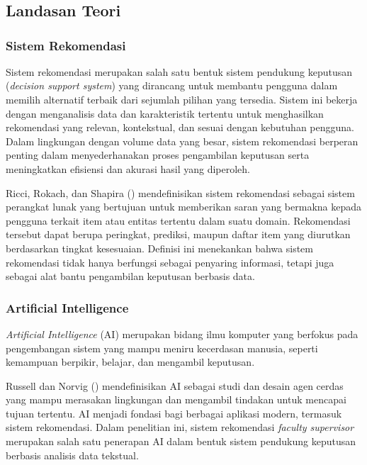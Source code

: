 \chapter{\babDua}



\section{Landasan Teori}\label{landasan-teori}

\subsection{Sistem Rekomendasi}\label{sistem-rekomendasi}

Sistem rekomendasi merupakan salah satu bentuk sistem pendukung keputusan (\textit{decision support system}) yang dirancang untuk membantu pengguna dalam memilih alternatif terbaik dari sejumlah pilihan yang tersedia. Sistem ini bekerja dengan menganalisis data dan karakteristik tertentu untuk menghasilkan rekomendasi yang relevan, kontekstual, dan sesuai dengan kebutuhan pengguna. Dalam lingkungan dengan volume data yang besar, sistem rekomendasi berperan penting dalam menyederhanakan proses pengambilan keputusan serta meningkatkan efisiensi dan akurasi hasil yang diperoleh.

Ricci, Rokach, dan Shapira (\citeyear{ricci2015recommender}) mendefinisikan sistem rekomendasi sebagai sistem perangkat lunak yang bertujuan untuk memberikan saran yang bermakna kepada pengguna terkait item atau entitas tertentu dalam suatu domain. Rekomendasi tersebut dapat berupa peringkat, prediksi, maupun daftar item yang diurutkan berdasarkan tingkat kesesuaian. Definisi ini menekankan bahwa sistem rekomendasi tidak hanya berfungsi sebagai penyaring informasi, tetapi juga sebagai alat bantu pengambilan keputusan berbasis data.

\subsection{Artificial Intelligence}\label{artificial-intelligence}

\textit{Artificial Intelligence} (AI) merupakan bidang ilmu komputer yang berfokus pada pengembangan sistem yang mampu meniru kecerdasan manusia, seperti kemampuan berpikir, belajar, dan mengambil keputusan.

Russell dan Norvig (\citeyear{russell2021ai}) mendefinisikan AI sebagai studi dan desain agen cerdas yang mampu merasakan lingkungan dan mengambil tindakan untuk mencapai tujuan tertentu. AI menjadi fondasi bagi berbagai aplikasi modern, termasuk sistem rekomendasi. Dalam penelitian ini, sistem rekomendasi \textit{faculty supervisor} merupakan salah satu penerapan AI dalam bentuk sistem pendukung keputusan berbasis analisis data tekstual.


